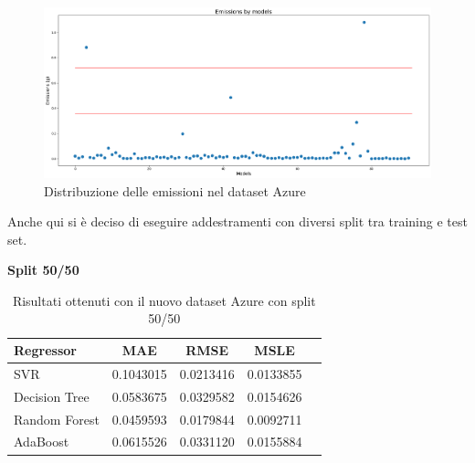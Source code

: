 \begin{figure}[H]
    \centering
    \includegraphics[scale=0.25]{images/nuova-situazione2.png}
    \caption{Distribuzione delle emissioni nel dataset Azure}
\end{figure}


\noindent Anche qui si è deciso di eseguire addestramenti con diversi split tra training e test set.

\noindent\textbf{Split 50/50}

\begin{table}[H]
    \centering
    \begin{tabular}{|>{\centering\arraybackslash}m{5cm}|c|c|c|c|}
        \hline
        \textbf{Regressor} & \textbf{MAE} & \textbf{RMSE} & \textbf{MSLE} \\ [10pt]
        \hline
        SVR & 0.1043015 & 0.0213416 & 0.0133855 \\ [10pt]
        \hline
        Decision Tree & 0.0583675 & 0.0329582 & 0.0154626 \\ [10pt]
        \hline
        Random Forest & 0.0459593 & 0.0179844 & 0.0092711 \\ [10pt]
        \hline
        AdaBoost & 0.0615526 & 0.0331120 & 0.0155884 \\ [10pt]
        \hline
    \end{tabular}
    \caption{Risultati ottenuti con il nuovo dataset Azure con split 50/50}
    \label{tab:results}
\end{table}

